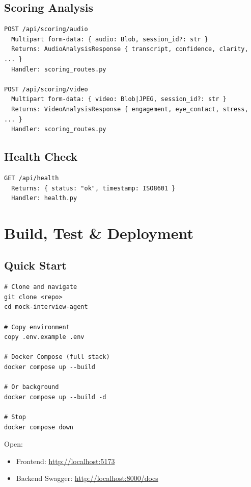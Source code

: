 \documentclass[11pt]{article}
\begin{document}
\subsection{Scoring Analysis}

\begin{verbatim}
POST /api/scoring/audio
  Multipart form-data: { audio: Blob, session_id?: str }
  Returns: AudioAnalysisResponse { transcript, confidence, clarity, ... }
  Handler: scoring_routes.py

POST /api/scoring/video
  Multipart form-data: { video: Blob|JPEG, session_id?: str }
  Returns: VideoAnalysisResponse { engagement, eye_contact, stress, ... }
  Handler: scoring_routes.py
\end{verbatim}

\subsection{Health Check}

\begin{verbatim}
GET /api/health
  Returns: { status: "ok", timestamp: ISO8601 }
  Handler: health.py
\end{verbatim}

\newpage

\section{Build, Test \& Deployment}

\subsection{Quick Start}

\begin{verbatim}
# Clone and navigate
git clone <repo>
cd mock-interview-agent

# Copy environment
copy .env.example .env

# Docker Compose (full stack)
docker compose up --build

# Or background
docker compose up --build -d

# Stop
docker compose down
\end{verbatim}

Open:
\begin{itemize}
  \item Frontend: \url{http://localhost:5173}
  \item Backend Swagger: \url{http://localhost:8000/docs}
\end{itemize}
\end{document}
